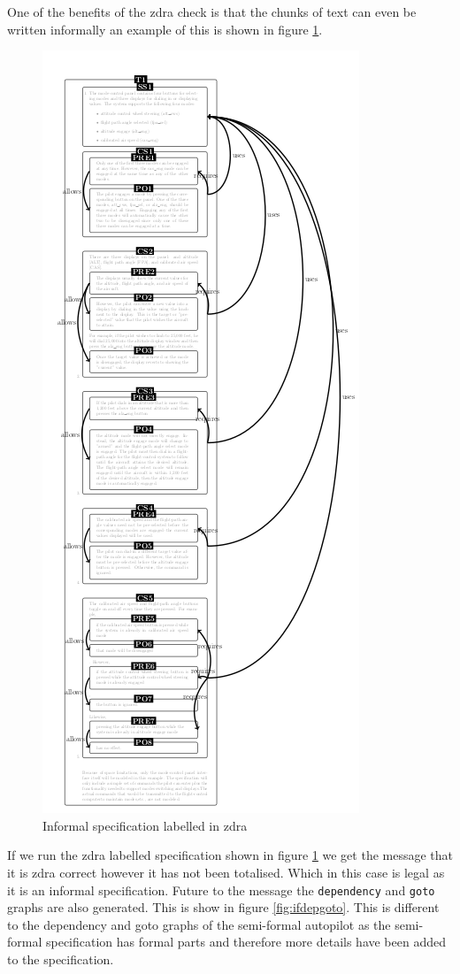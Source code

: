 One of the benefits of the \gls{zdra} check is that the chunks of text can even be
written informally an example of this is shown in figure \ref{fig:informalzdra}.

\begin{figure}[H]
     \centering
     \includegraphics[scale=0.6]{Figures/fullexample/informalZDRa.png}
     \caption{Informal specification labelled in \gls{zdra} \label{fig:informalzdra}}
\end{figure}

If we run the \gls{zdra} labelled specification shown in figure
\ref{fig:informalzdra} we get the message that it is \gls{zdra} correct however
it has not been totalised. Which in this case is legal as it is an informal
specification. Future to the message the \texttt{dependency} and \texttt{goto}
graphs are also generated. This is show in figure \ref{fig:ifdepgoto}. This is different
to the dependency and goto graphs of the semi-formal autopilot as the
semi-formal specification has formal parts and therefore more details have been
added to the specification.


